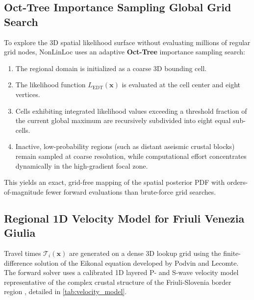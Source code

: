 \subsection{Oct-Tree Importance Sampling Global Grid Search}
To explore the 3D spatial likelihood surface without evaluating
millions of regular grid nodes, \ac{NonLinLoc} uses an adaptive
\textbf{Oct-Tree} importance sampling search:
\begin{enumerate}
  \item The regional domain  is
    initialized as a coarse 3D bounding cell.
  \item The likelihood function $L_{\mathrm{EDT}}(\mathbf{x})$ is
    evaluated at the cell center and eight vertices.
  \item Cells exhibiting integrated likelihood values exceeding a
    threshold fraction of the current global maximum are recursively
    subdivided into eight equal sub-cells.
  \item Inactive, low-probability regions (such as distant aseismic
    crustal blocks) remain sampled at coarse resolution, while
    computational effort concentrates dynamically in the
    high-gradient focal zone.
\end{enumerate}
This yields an exact, grid-free mapping of the spatial posterior PDF
with orders-of-magnitude fewer forward evaluations than brute-force
grid searches.

\subsection{Regional 1D Velocity Model for Friuli Venezia Giulia}
Travel times $\mathcal{T}_i(\mathbf{x})$ are generated on a dense 3D
lookup grid using the finite-difference solution of the Eikonal
equation developed by Podvin and Lecomte. The forward solver uses a
calibrated 1D layered P- and S-wave velocity model representative of
the complex crustal structure of the Friuli-Slovenia border region
\parencite{SMINO}, detailed in \cref{tab:velocity_model}.

